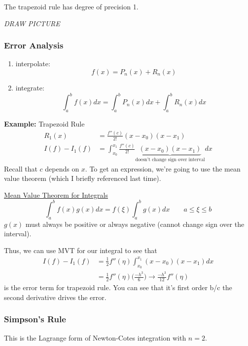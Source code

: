 \documentclass[12pt]{article}
\begin{document}
The trapezoid rule has degree of precision 1.

\textit{DRAW PICTURE}

\subsubsection{Error Analysis}
\begin{enumerate}
\item interpolate:
\[f(x) = P_n(x) + R_n(x)\]
\item integrate:
\[\int_a^b f(x) dx = \int_a^b P_n(x) dx + \int_a^b R_n(x) dx\]
\end{enumerate}

\textbf{Example:} Trapezoid Rule\\
\begin{align}
R_1(x) &= \frac{f''(c)}{2!}(x-x_0)(x-x_1) \\
I(f) - I_1(f) &= \int_{x_0}^{x_1} \frac{f''(c)}{2!}\underbrace{(x-x_0)(x-x_1)}_{\text{doesn't change sign over interval}} dx
\end{align}
%
Recall that $c$ depends on $x$. To get an expression, we're going to use the mean value theorem (which I briefly referenced last time).

\underline{Mean Value Theorem for Integrals}\\
\[\int_a^b f(x)g(x)dx = f(\xi) \int_a^b g(x)dx \qquad a\leq \xi \leq b\]
$g(x)$ must always be positive or always negative (cannot change sign over the interval).

Thus, we can use MVT for our integral to see that
\begin{align}
I(f) - I_1(f) &= \frac{1}{2}f''(\eta) \int_{x_0}^{x_1} (x-x_0)(x-x_1) dx \\
&= \frac{1}{2}f''(\eta) \bigl(\frac{-h^3}{6}\bigr) \rightarrow \boxed{\frac{-h^3}{12}f''(\eta)}
\end{align}
is the error term for trapezoid rule. You can see that it's first order b/c the second derivative drives the error.


\subsubsection{Simpson's Rule}
This is the Lagrange form of Newton-Cotes integration with $n=2$.
\end{document}
